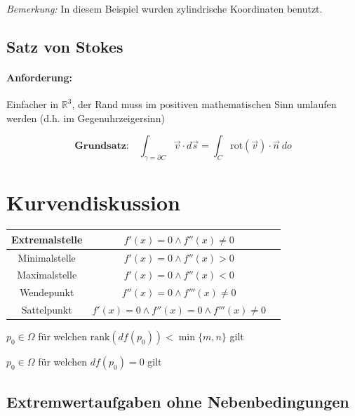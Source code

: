 \documentclass[11pt]{article}
\begin{document}
\emph{Bemerkung:} In diesem Beispiel wurden zylindrische Koordinaten benutzt.

\subsection{Satz von Stokes}

\paragraph{Anforderung:} Einfacher in $\mathbb{R}^3$, der Rand muss im positiven mathematischen Sinn umlaufen werden (d.h. im Gegenuhrzeigersinn)

\begin{equation*}
	\textbf{Grundsatz:}\quad\int_{\gamma = \partial C} \vec{v} \cdot d\vec{s} = \int_C \text{rot}(\vec{v}) \cdot \vec{n}\ do
\end{equation*}

\clearpage

\section{Kurvendiskussion}

\begin{table}[H]
\centering
\begin{tabular}{|c|c|c|}
\hline
Extremalstelle & $f'(x) =  0 \land f''(x) \neq 0$ \\ \hline
Minimalstelle & $f'(x) = 0 \land f''(x) > 0$ \\ \hline
Maximalstelle & $f'(x) = 0 \land f''(x) < 0$ \\ \hline
Wendepunkt & $f''(x) = 0 \land f'''(x) \neq 0$ \\ \hline
Sattelpunkt & $f'(x) = 0 \land f''(x) = 0 \land f'''(x) \neq 0$ \\ \hline
\end{tabular}
\end{table}

\begin{description}[labelindent=16pt,style=multiline,leftmargin=6cm, noitemsep]
	\item[kritischer Punkt:] $p_0 \in \Omega$ f{\"u}r welchen $\text{rank}(df(p_0)) < \min\{m,n\}$ gilt
	\item[Kandidaten f{\"u}r Extrema:] $p_0 \in \Omega$ f{\"u}r welchen $df(p_0) = 0$ gilt
\end{description}

\subsection{Extremwertaufgaben ohne Nebenbedingungen}
\end{document}
